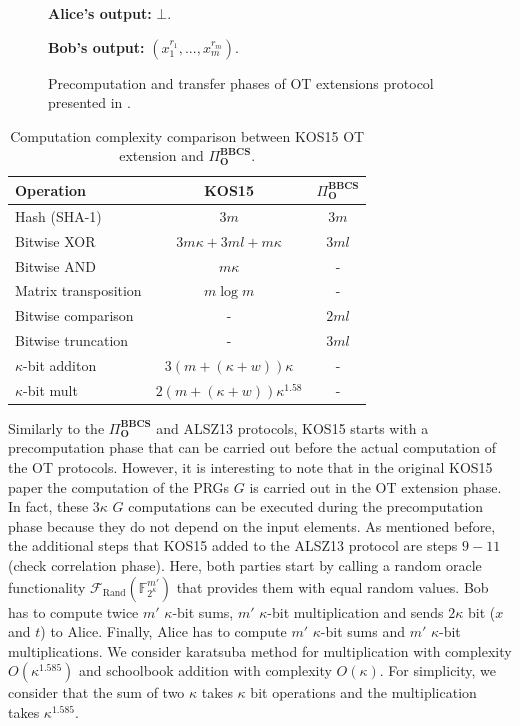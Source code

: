 \begin{figure}
\begin{tcolorbox}
    \textbf{Alice's output:} $\bot$.
    
    \textbf{Bob's output:} $(x^{r_1}_1, ..., x^{r_m}_m)$.

        
        \end{tcolorbox}
    \caption{Precomputation and transfer phases of OT extensions protocol presented in \cite{KOS15}.}
    \label{fig:K15Protocol}
\end{figure}

\begin{table}
\centering
\begin{tabular}{lcc}
\toprule
Operation & KOS15 & $\Pi^{\textbf{BBCS}}_{\textbf{O}}$ \\
\midrule
Hash (SHA-1)    & $3m$              & $3m$ \\ 
Bitwise XOR      & $3 m\kappa + 3ml + m\kappa$             & $3ml $  \\ 
Bitwise AND  & $m\kappa$              & -           \\ 
Matrix transposition & $m\log m$              & -           \\ 
Bitwise comparison & -             & $2ml$           \\ 
Bitwise truncation & -            & $3ml$           \\ 
$\kappa$-bit additon & $3(m + (\kappa + w))\kappa$ & - \\ 
$\kappa$-bit mult & $2(m + (\kappa + w))\kappa^{1.58}$ & - \\ 
\bottomrule
\end{tabular}
\caption{Computation complexity comparison between KOS15 OT extension and $\Pi^{\textbf{BBCS}}_{\textbf{O}}$.}
\label{table:complexity}
\end{table}

Similarly to the $\Pi^{\textbf{BBCS}}_{\textbf{O}}$ and ALSZ13 protocols, KOS15 starts with a precomputation phase that can be carried out before the actual computation of the OT protocols. However, it is interesting to note that in the original KOS15 paper \cite{KOS15} the computation of the PRGs $G$ is carried out in the OT extension phase. In fact, these $3\kappa$ $G$ computations can be executed during the precomputation phase because they do not depend on the input elements. As mentioned before, the additional steps that KOS15 added to the ALSZ13 protocol are steps $9-11$ (check correlation phase). Here, both parties start by calling a random oracle functionality $\mathcal{F}_{\text{Rand}}(\mathbb{F}^{m'}_{2^\kappa})$ that provides them with equal random values. Bob has to compute twice $m'$ $\kappa$-bit sums, $m'$ $\kappa$-bit multiplication and sends $2\kappa$ bit ($x$ and $t$) to Alice. Finally, Alice has to compute $m'$ $\kappa$-bit sums and $m'$ $\kappa$-bit multiplications. We consider karatsuba method for multiplication with complexity $O(\kappa^{1.585})$ and schoolbook addition with complexity $O(\kappa)$. For simplicity, we consider that the sum of two $\kappa$ takes $\kappa$ bit operations and the multiplication takes $\kappa^{1.585}$. 

